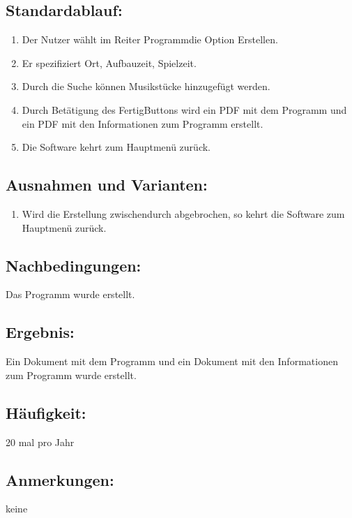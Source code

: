 \documentclass[a4paper,10pt]{scrartcl}
\begin{document}
\subsection{Standardablauf:}
\begin{enumerate}
	\item Der Nutzer wählt im Reiter \glqq Programm\grqq die Option \glqq Erstellen\grqq.
	\item Er spezifiziert Ort, Aufbauzeit, Spielzeit.
	\item Durch die Suche können Musikstücke hinzugefügt werden.
	\item Durch Betätigung des \glqq Fertig\grqq Buttons wird ein PDF mit dem Programm und ein PDF mit den Informationen zum Programm erstellt.
	\item Die Software kehrt zum Hauptmenü zurück.
\end{enumerate}
\subsection{Ausnahmen und Varianten:}
\begin{enumerate}
	\item Wird die Erstellung zwischendurch abgebrochen, so kehrt die Software zum Hauptmenü zurück.
\end{enumerate}
\subsection{Nachbedingungen:}
Das Programm wurde erstellt.
\subsection{Ergebnis:}
Ein Dokument mit dem Programm und ein Dokument mit den Informationen zum Programm wurde erstellt.
\subsection{Häufigkeit:}
20 mal pro Jahr
\subsection{Anmerkungen:}
keine
\newpage
\end{document}
